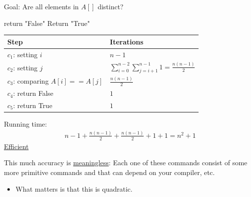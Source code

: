 \documentclass[11pt]{article}
\begin{document}
\begin{enumerate}
Goal: Are all elements in \(A[]\) distinct?
\begin{algorithmic}
			\State return "False"
		\EndIf
	   \EndFor
\EndFor
\State Return "True"
\end{algorithmic}
\begin{center}
\begin{tabular}{ll}
Step & Iterations\\
\hline
\(c_1\): setting \(i\) & \(n-1\)\\
\(c_2\): setting \(j\) & \(\sum_{i=0}^{n-2}\sum_{j=i+1}^{n-1}1=\frac{n(n-1)}{2}\)\\
\(c_3\): comparing \(A[i]==A[j]\) & \(\frac{n(n-1)}{2}\)\\
\(c_4\): return False & \(1\)\\
\(c_5\): return True & \(1\)\\
\end{tabular}
\end{center}

Running time: 
\begin{align*}
& n-1+\frac{n(n-1)}{2}+\frac{n(n-1)}{2}+1+1 = n^2+1
\end{align*}
\uline{Efficient}

This much accuracy is \uline{meaningless}: Each one of these commands consist of some more primitive commands and that can depend on your compiler, etc.
\begin{itemize}
\item What matters is that this is quadratic.
\end{itemize}
\end{enumerate}
\end{document}

